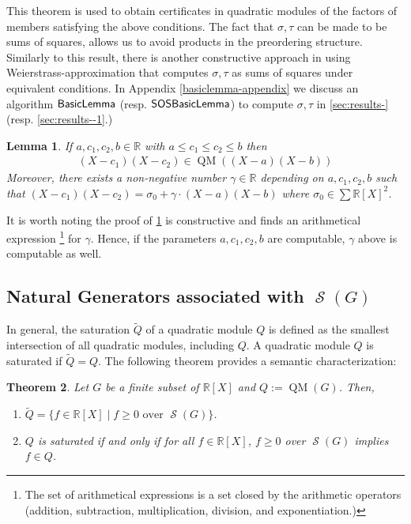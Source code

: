 \documentclass[preprint,12pt,authoryear]{elsarticle}
\newtheorem{theorem}{Theorem}[section]
\newtheorem{lemma}[theorem]{Lemma}
\newcommand{\rX}{\mathbb{R}[X]}
\DeclareMathOperator{\quadmod}{QM}
\DeclareMathOperator{\semialgebraic}{\mathcal{S}}
\DeclareMathOperator{\algBasicLemma}{\sf BasicLemma}
\DeclareMathOperator{\algSOSBasicLemma}{\sf SOSBasicLemma}
\begin{document}
This theorem is used to obtain certificates in quadratic modules of the factors
of members satisfying the above conditions. The fact that $\sigma, \tau$ can be
made to be sums of squares, allows us to avoid products in the preordering
structure. Similarly to this result, there is another constructive approach in
\cite[Proposition 4.8]{scheiderer2000} using Weierstrass-approximation that
computes $\sigma, \tau$ as sums of squares under equivalent conditions. In
 Appendix \ref{basiclemma-appendix} we discuss an algorithm $\algBasicLemma$
(resp. $\algSOSBasicLemma$) to compute $\sigma, \tau$ in
\th\ref{sec:results-} (resp. \th\ref{sec:results--1}.)

\begin{lemma}\cite[Lemma 1.5]{Augustin2008TheMP}
  \th\label{sec:cert-elem-ponats}
  If $a, c_1, c_2, b \in \mathbb{R}$ with $a \leq c_1 \leq c_2 \leq b$ then
  \begin{equation}
    \label{sec:cert-elem-ponats-1}
    \begin{split}
      (X - c_1)(X - c_2) \in \quadmod((X - a)(X - b))
    \end{split}
  \end{equation}
  Moreover, there exists a non-negative number $\gamma \in \mathbb{R}$ depending
  on $a, c_1, c_2, b$ such that
  $(X - c_1)(X - c_2) = \sigma_0 + \gamma \cdot (X-a)(X-b)$ where
  $\sigma_0 \in \sum{\rX}^2$.
\end{lemma}

It is worth noting the proof of \th\ref{sec:cert-elem-ponats} is constructive
and finds an arithmetical expression \footnote{The set of arithmetical
  expressions is a set closed by the arithmetic operators (addition,
  subtraction, multiplication, division, and exponentiation.)} for
$\gamma$. Hence, if the parameters $a, c_1, c_2, b$ are computable, $\gamma$
above is computable as well.

 
\subsection{Natural Generators associated with $\semialgebraic(G)$}
\label{sec:natur-gener-assoc-1999}

In general, the
saturation $\tilde{Q}$ of a quadratic module $Q$ is defined as the smallest
intersection of all quadratic modules, including $Q$. A quadratic module $Q$ is
saturated if $\tilde{Q} = Q$. The following theorem provides a semantic characterization:

\begin{theorem}\cite[][Proposition 2.6.1, page 33]{marshall2008positive}
  \th\label{sec:preliminaries-1}
  Let $G$ be a finite subset of $\rX$ and $Q := \quadmod(G)$. Then,
  \begin{enumerate}
  \item $\tilde{Q} = \{f \in \rX \mid f \geq 0 \text{ over }
    \semialgebraic(G)\}$. 
  \item $Q$ is saturated if and only if for all $f \in \rX$, $f \geq
    0$ over $\semialgebraic(G)$ implies $f \in Q$.
  \end{enumerate}
\end{theorem}
\end{document}
